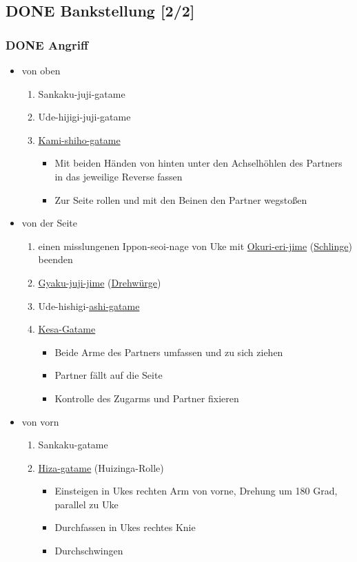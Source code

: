 \documentclass[11pt]{article}
\begin{document}
\subsection{{\bfseries\sffamily DONE} \label{orgbc37293}Bankstellung [2/2]}
\label{sec:org018a726}
\subsubsection{{\bfseries\sffamily DONE} Angriff}
\label{sec:org9eb216e}
\begin{itemize}
\item von oben
\begin{enumerate}
\item Sankaku-juji-gatame
\item Ude-hijigi-juji-gatame
\item \hyperref[org22a024c]{Kami-shiho-gatame}
\begin{itemize}
\item Mit beiden Händen von hinten unter den Achselhöhlen des Partners in das jeweilige Reverse fassen
\item Zur Seite rollen und mit den Beinen den Partner wegstoßen
\end{itemize}
\end{enumerate}
\item von der Seite
\begin{enumerate}
\item einen misslungenen Ippon-seoi-nage von Uke mit \hyperref[orgfb63c6b]{Okuri-eri-jime} (\hyperref[org8b18817]{Schlinge}) beenden
\item \hyperref[orgd4a5a2b]{Gyaku-juji-jime} (\hyperref[org4fedd56]{Drehwürge})
\item Ude-hishigi-\hyperref[orga92f42c]{ashi-gatame}
\item \hyperref[org0fccb72]{Kesa-Gatame}
\begin{itemize}
\item Beide Arme des Partners umfassen und zu sich ziehen
\item Partner fällt auf die Seite
\item Kontrolle des Zugarms und Partner fixieren
\end{itemize}
\end{enumerate}
\item von vorn
\begin{enumerate}
\item Sankaku-gatame
\item \hyperref[orga0a2132]{Hiza-gatame} (Huizinga-Rolle)
\begin{itemize}
\item Einsteigen in Ukes rechten Arm von vorne, Drehung um 180 Grad, parallel zu Uke
\item Durchfassen in Ukes rechtes Knie
\item Durchschwingen
\end{itemize}
\end{enumerate}
\end{itemize}
\end{document}

